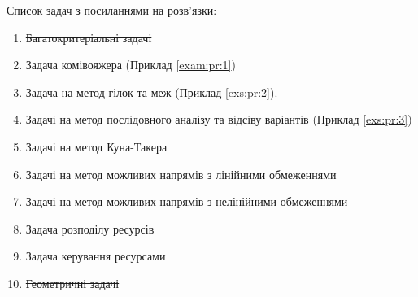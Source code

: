 Список задач з посиланнями на розв’язки:
\begin{enumerate}
\item \sout{Багатокритеріальні задачі}
\item Задача комівояжера (Приклад \ref{exam:pr:1})
\item Задача на метод гілок та меж (Приклад \ref{exs:pr:2}).
\item Задачі на метод послідовного аналізу та відсіву варіантів (Приклад \ref{exs:pr:3})
\item Задачі на метод Куна-Такера
\item Задачі на метод можливих напрямів з лінійними обмеженнями
\item Задачі на метод можливих напрямів з нелінійними обмеженнями
\item Задача розподілу ресурсів
\item Задача керування ресурсами
\item \sout{Геометричні задачі}
\end{enumerate}
